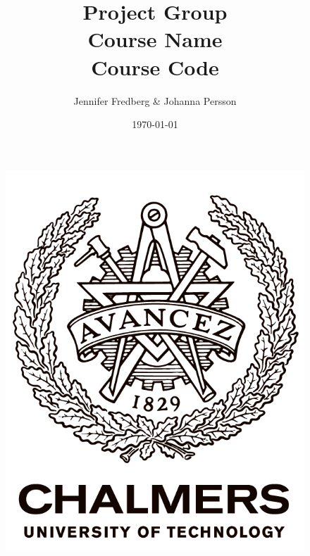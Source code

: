 \documentclass[a4paper, 12pt]{article}
\begin{document}
\begin{titlepage}

\title{\textbf{Project Group} \\ \textbf{Course Name} \\ Course Code} 

\author{Jennifer Fredberg \& Johanna Persson}    

\date{\today}

\maketitle
\begin{figure}[H]
\centering
\includegraphics[scale=0.5 ]{Images/Chalmers.png}
\end{figure}
\end{titlepage}
\end{document}
